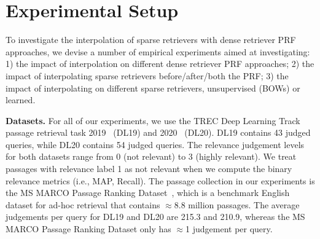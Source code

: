 

\section{Experimental Setup}

To investigate the interpolation of sparse retrievers with dense retriever PRF approaches, we devise a number of empirical experiments aimed at investigating: 1) the impact of interpolation on different dense retriever PRF approaches; 2) the impact of interpolating sparse retrievers before/after/both the PRF; 3) the impact of interpolating on different sparse retrievers, unsupervised (BOWs) or learned.

\textbf{Datasets.} For all of our experiments, we use the TREC Deep Learning Track passage retrieval task 2019~\cite{craswell2020overview} (DL19) and 2020~\cite{craswell2021overview} (DL20). DL19 contains 43 judged queries, while DL20 contains 54 judged queries. The relevance judgement levels for both datasets  range from 0 (not relevant) to 3 (highly relevant). 
We treat passages with relevance label 1 as not relevant when we compute the binary relevance metrics (i.e., MAP, Recall). The passage collection in our experiments is the MS MARCO Passage Ranking Dataset~\cite{nguyen2016ms}, which is a benchmark English dataset for ad-hoc retrieval that contains $\approx$8.8 million passages. The average judgements per query for DL19 and DL20 are 215.3 and 210.9, whereas the MS MARCO Passage Ranking Dataset only has $\approx$1 judgement per query.



